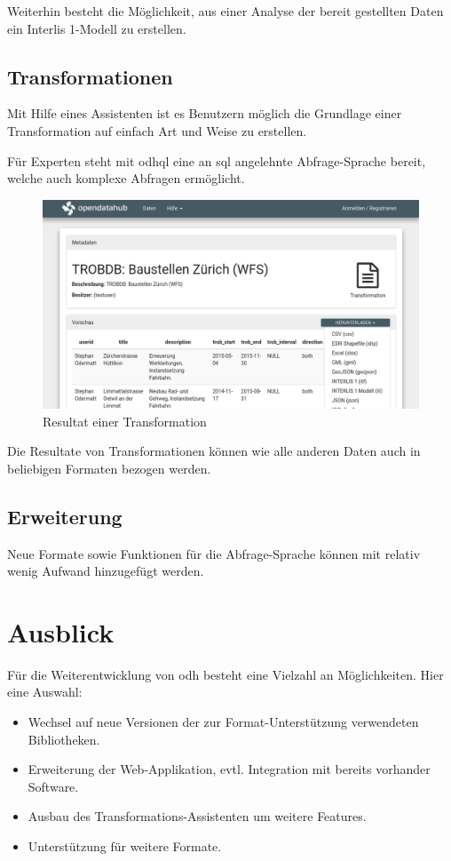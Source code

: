 Weiterhin besteht die Möglichkeit, aus einer Analyse der bereit gestellten Daten ein Interlis 1-Modell zu erstellen.

\subsection*{Transformationen}
Mit Hilfe eines Assistenten ist es Benutzern möglich die Grundlage einer Transformation auf einfach Art und Weise zu erstellen. 

Für Experten steht mit \gls{odhql} eine an \acs{sql} angelehnte Abfrage-Sprache bereit, welche auch komplexe Abfragen ermöglicht.

\begin{figure}[H]
    \centering
    \includegraphics[width=2\linewidth/3]{fig/transformation-detail}
    \caption*{Resultat einer Transformation}
\end{figure}

Die Resultate von Transformationen können wie alle anderen Daten auch in beliebigen Formaten bezogen werden.

\subsection*{Erweiterung}
Neue Formate sowie Funktionen für die Abfrage-Sprache können mit relativ wenig Aufwand hinzugefügt werden.

\section*{Ausblick}
Für die Weiterentwicklung von \acs{odh} besteht eine Vielzahl an Möglichkeiten. Hier eine Auswahl:
\begin{itemize}
\item Wechsel auf neue Versionen der zur Format-Unterstützung verwendeten Bibliotheken.
\item Erweiterung der Web-Applikation, evtl. Integration mit bereits vorhander Software.
\item Ausbau des Transformations-Assistenten um weitere Features.
\item Unterstützung für weitere Formate.
\end{itemize}

